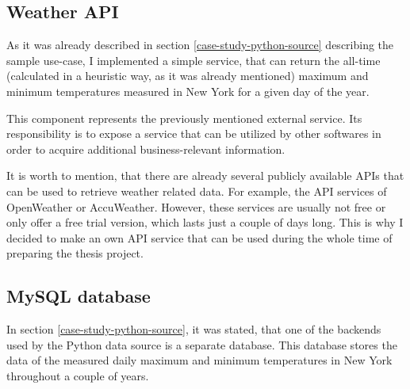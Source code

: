 \subsection{Weather API}

As it was already described in section \ref{case-study-python-source} describing the sample use-case, I implemented a simple service, that can return the all-time (calculated in a heuristic way, as it was already mentioned) maximum and minimum temperatures measured in New York for a given day of the year.

This component represents the previously mentioned external service. Its responsibility is to expose a service that can be utilized by other softwares in order to acquire additional business-relevant information.


It is worth to mention, that there are already several publicly available APIs that can be used to retrieve weather related data. For example, the API services of OpenWeather\cite{openweather} or AccuWeather\cite{accuweather}. However, these services are usually not free or only offer a free trial version, which lasts just a couple of days long. This is why I decided to make an own API service that can be used during the whole time of preparing the thesis project.

\subsection{MySQL database}

In section \ref{case-study-python-source}, it was stated, that one of the backends used by the Python data source is a separate database. This database stores the data of the measured daily maximum and minimum temperatures in New York throughout a couple of years.



